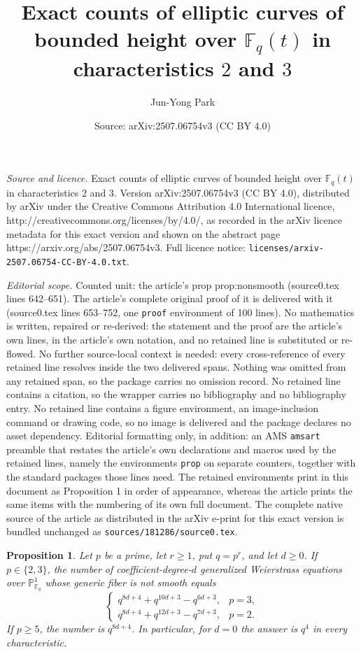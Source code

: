 \documentclass[10pt,a4paper]{amsart}
\title{Exact counts of elliptic curves of bounded height over $\mathbb F_q(t)$ in characteristics $2$ and $3$}
\author{Jun-Yong Park}
\date{Source: arXiv:2507.06754v3 (CC BY 4.0)}
\newtheorem{prop}{Proposition}
\newcommand{\Fb}{\mathbb{F}}
\newcommand{\Pb}{\mathbb{P}}
\begin{document}
\maketitle

\noindent\emph{Source and licence.} Exact counts of elliptic curves of bounded height over $\mathbb F_q(t)$ in characteristics $2$ and $3$. Version arXiv:2507.06754v3 (CC BY 4.0), distributed by arXiv under the Creative Commons Attribution 4.0 International licence, http://creativecommons.org/licenses/by/4.0/, as recorded in the arXiv licence metadata for this exact version and shown on the abstract page https://arxiv.org/abs/2507.06754v3. Full licence notice: \texttt{licenses/arxiv-2507.06754-CC-BY-4.0.txt}.\par\smallskip

\noindent\textit{Editorial scope.} Counted unit: the article's prop prop:nonsmooth (source0.tex lines 642--651). The article's complete original proof of it is delivered with it (source0.tex lines 653--752, one \texttt{proof} environment of 100 lines). No mathematics is written, repaired or re-derived: the statement and the proof are the article's own lines, in the article's own notation, and no retained line is substituted or re-flowed.  No further source-local context is needed: every cross-reference of every retained line resolves inside the two delivered spans.  Nothing was omitted from any retained span, so the package carries no omission record.  No retained line contains a citation, so the wrapper carries no bibliography and no bibliography entry.  No retained line contains a figure environment, an image-inclusion command or drawing code, so no image is delivered and the package declares no asset dependency.  Editorial formatting only, in addition: an AMS \texttt{amsart} preamble that restates the article's own declarations and macros used by the retained lines, namely the environments \texttt{prop} on separate counters, together with the standard packages those lines need.  The retained environments print in this document as Proposition 1 in order of appearance, whereas the article prints the same items with the numbering of its own full document.  The complete native source of the article as distributed in the arXiv e-print for this exact version is bundled unchanged as \texttt{sources/181286/source0.tex}.
\begin{prop}\label{prop:nonsmooth}
Let $p$ be a prime, let $r\geq1$, put $q=p^r$, and let $d\geq0$.  If $p\in\{2,3\}$, the number of coefficient-degree-$d$ generalized Weierstrass equations over $\Pb^1_{\Fb_q}$ whose generic fiber is not smooth equals
\[
\begin{cases}
q^{8d+4}+q^{10d+3}-q^{6d+3},&p=3,\\[1mm]
q^{8d+4}+q^{12d+3}-q^{7d+3},&p=2.
\end{cases}
\]
If $p\geq5$, the number is $q^{8d+4}$.  In particular, for $d=0$ the answer is $q^4$ in every characteristic.
\end{prop}
\end{document}

